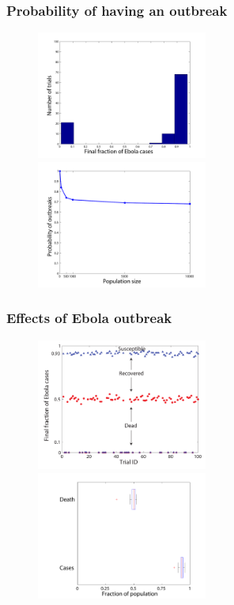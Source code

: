\documentclass[30pt]{beamer}
\begin{document}
\begin{frame}
\frametitle{Probability of having an outbreak}
\begin{figure}
\includegraphics[width = 0.5\textwidth]{N100Hist.pdf}
\includegraphics[width = 0.5\textwidth]{OutbreakProb.pdf}
\end{figure}
\end{frame}

\begin{frame}
\frametitle{Effects of Ebola outbreak}
\begin{figure}
\includegraphics[width = 0.5\textwidth]{N1000Scatter.pdf}
\includegraphics[width = 0.5\textwidth]{BWplot.pdf}

\end{figure}
\end{frame}
\end{document}
